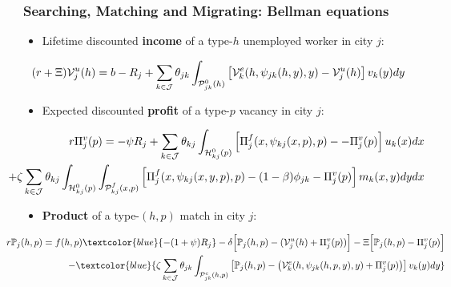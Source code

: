 \documentclass{beamer}
\newcommand{\1}{\mathbb{1}}
\newcommand{\J}{\mathcal{J}}
\newcommand{\sumktot}{\sum_{\substack{k \in \J}}}
\newcommand{\V}{\mathcal{V}}
\begin{document}
\begin{frame}\frametitle{Searching, Matching and Migrating: Bellman equations}
\begin{itemize}
\item Lifetime discounted \textbf{income} of a type-$h$ unemployed worker in city $j$:
\vspace{-0.3cm}
\begin{footnotesize}
\begin{eqnarray*}
\footnotesize
\hspace{-1cm}(r+\Xi) \V^u_j(h) 
=b-R_j +\sumktot  \theta_{jk} \int_{\mathcal{P}^0_{jk}(h)} \left[\V^e_k(h,\psi_{jk}(h,y),y)-\V^u_j(h)\right] v_k(y)dy
\end{eqnarray*}
\end{footnotesize}
\item Expected discounted \textbf{profit} of a type-$p$ vacancy in city $j$:
\begin{footnotesize}
\begin{eqnarray*}
 &&\hspace{-2cm}r \Pi^v_j(p) 
= -\psi R_j+ \sumktot \theta_{kj}
\int_{\mathcal{H}^0_{kj}(p)}  \left[\Pi^f_j(x,\psi_{kj}(x,p),p)--\Pi_j^v(p)\right] u_k(x)dx\\
&&\hspace{-1.5cm}+\zeta\sumktot \theta_{kj}\int_{\mathcal{H}^0_{kj}(p)}\int_{\mathcal{P}^f_{kj}(x,p)} \left[ 
\Pi^f_j(x,\psi_{kj}(x,y,p),p)-(1-\beta)\phi_{jk}-\Pi^v_j(p) \right] m_k(x,y)dydx\notag
\end{eqnarray*}
\end{footnotesize}

\item \textbf{Product} of a type-$(h,p)$ match in city $j$:\begin{footnotesize}
\begin{eqnarray*}
&&\hspace{-1.7cm}r\mathbb{P}_j(h,p)= f(h,p)\textcolor{blue}{-(1+\psi)R_j} -\delta\Big[\mathbb{P}_j(h,p)-(\V^u_j(h)+\Pi^v_j(p))\Big]-\Xi\Big[\mathbb{P}_j(h,p)-\Pi^v_j(p)\Big]\\
&&\hspace{-0.8cm}-\textcolor{blue}{\zeta\sumktot\theta_{jk}\int_{\mathcal{P}^c_{jk}(h,p)} \left[\mathbb{P}_j(h,p)-\left(\V^e_k(h,\psi_{jk}(h,p,y),y)+\Pi^v_j(p)\right)\right]v_k(y)dy}
\end{eqnarray*}
\end{footnotesize}
\end{itemize}
\end{frame}
\end{document}
